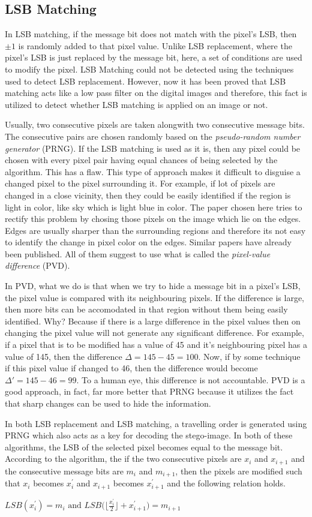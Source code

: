\documentclass{report}
\begin{document}
\subsection{LSB Matching}
In LSB matching, if the message bit does not match with the pixel's LSB, then $\pm 1$ is randomly added to that pixel value. Unlike LSB replacement, where the pixel's LSB is just replaced by the message bit, here, a set of conditions are used to modify the pixel. LSB Matching could not be detected using the techniques used to detect LSB replacement. However, now it has been proved that LSB matching acts like a low pass filter on the digital images and therefore, this fact is utilized to detect whether LSB matching is applied on an image or not. \par Usually, two consecutive pixels are taken alongwith two consecutive message bits. The consecutive pairs are chosen randomly based on the {\it pseudo-random number generator} (PRNG). If the LSB matching is used as it is, then any pixel could be chosen with every pixel pair having equal chances of being selected by the algorithm. This has a flaw. This type of approach makes it difficult to disguise a changed pixel to the pixel surrounding it. For example, if lot of pixels are changed in a close vicinity, then they could be easily identified if the region is light in color, like sky which is light blue in color. The paper chosen here tries to rectify this problem by chosing those pixels on the image which lie on the edges. Edges are usually sharper than the surrounding regions and therefore its not easy to identify the change in pixel color on the edges. Similar papers have already been published. All of them suggest to use what is called the {\it pixel-value difference} (PVD). \par In PVD, what we do is that when we try to hide a message bit in a pixel's LSB, the pixel value is compared with its neighbouring pixels. If the difference is large, then more bits can be accomodated in that region without them being easily identified. Why? Because if there is a large difference in the pixel values then on changing the pixel value will not generate any significant difference. For example, if a pixel that is to be modified has a value of 45 and it's neighbouring pixel has a value of 145, then the difference $\displaystyle \Delta = 145-45=100$. Now, if by some technique if this pixel value if changed to 46, then the difference would become $\displaystyle \Delta' = 145-46 = 99$. To a human eye, this difference is not accountable. PVD is a good approach, in fact, far more better that PRNG because it utilizes the fact that sharp changes can be used to hide the information. \par In both LSB replacement and LSB matching, a travelling order is generated using PRNG which also acts as a key for decoding the stego-image. In both of these algorithms, the LSB of the selected pixel becomes equal to the message bit. According to the algorithm, the if the two consecutive pixels are $x_{i}$ and $x_{i+1}$ and the consecutive message bits are $m_{i}$ and $m_{i+1}$, then the pixels are modified such that $x_{i}$ becomes $x_{i}^{'}$ and $x_{i+1}$ becomes $x_{i+1}^{'}$ and the following relation holds.
\begin{center}
$ \displaystyle LSB(x_{i}^{'})=m_{i} \textrm{ and } LSB \Big( \Big\lfloor{\frac{x_{i}^{'}}{2}}\Big \rfloor + x_{i+1}^{'} \Big) = m_{i+1}$
\end{center}
\end{document}

